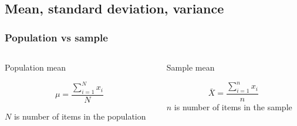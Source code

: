 \documentclass{beamer}
\begin{document}
    \subsection{Mean, standard deviation, variance}
    \begin{frame}
        \frametitle{Population vs sample}
        \begin{columns}
            \begin{column}{0.4\textwidth}  %
                \begin{center}
                    \begin{block}{Population mean}
                        
                        \begin{equation}    %
                            \mu = \frac{\sum_{i=1}^N x_i}{N}
                        \end{equation}

                        $N$ is number of items in the population
                    \end{block}
                \end{center}
            \end{column}
            \begin{column}{0.4\textwidth}  %
                \begin{center}
                    \begin{block}{Sample mean}
                        
                        \begin{equation}    %
                            \bar{{X}} = \frac{\sum_{i=1}^n x_i}{n}
                        \end{equation}
                        $n$ is number of items in the sample
                    \end{block}
                \end{center}
            \end{column}
        \end{columns}
    \end{frame}    
    
\end{document}
